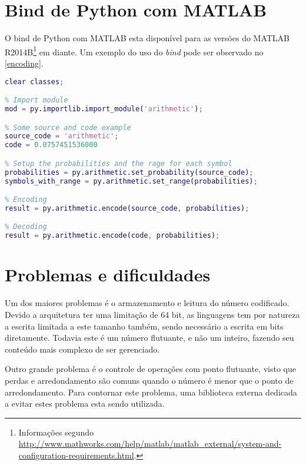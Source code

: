 \begin{multicols*}{2}


\section*{Bind de Python com MATLAB} %
\label{sec:bind_com_matlab}

O bind de Python com MATLAB esta disponível para as versões do MATLAB R2014B\footnote{Informações segundo \url{http://www.mathworks.com/help/matlab/matlab_external/system-and-configuration-requirements.html}.} em diante. Um exemplo do uso do \textit{bind} pode ser observado no \autoref{encoding}.

\begin{lstlisting}[language=MATLAB,numbers=none,basicstyle=\footnotesize,label=encoding,caption={Chamada de funções python no MATLAB}]
% clear classes, scripts, etc
clear classes;

% Import module
mod = py.importlib.import_module('arithmetic');

% Some source and code example
source_code = 'arithmetic';
code = 0.0757451536000

% Setup the probabilities and the rage for each symbol
probabilities = py.arithmetic.set_probability(source_code);
symbols_with_range = py.arithmetic.set_range(probabilities);

% Encoding
result = py.arithmetic.encode(source_code, probabilities);

% Decoding
result = py.arithmetic.encode(code, probabilities);
\end{lstlisting}


\section*{Problemas e dificuldades} %
\label{sec:problemas_e_dificuldades}

Um dos maiores problemas é o armazenamento e leitura do número codificado. Devido a arquitetura ter uma limitação de 64 bit, as linguagens tem por natureza a escrita limitada a este tamanho também, sendo necessário a escrita em bits diretamente. Todavia este é um número flutuante, e não um inteiro, fazendo seu conteúdo mais complexo de ser gerenciado.

Outro grande problema é o controle de operações com ponto flutuante, visto que perdas e arredondamento são comuns quando o número é menor que o ponto de arredondamento. Para contornar este problema, uma biblioteca externa dedicada a evitar estes problema esta sendo utilizada.


\end{multicols*}
